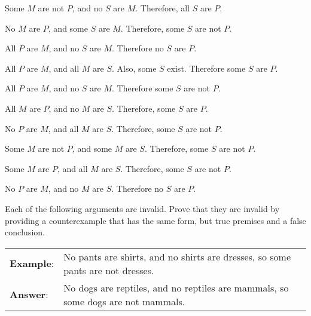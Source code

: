 \begin{exercises}

\item Some $M$ are not $P$, and no $S$ are $M$. Therefore, all $S$ are $P$.

\item No $M$ are $P$, and some $S$ are $M$. Therefore, some $S$ are not $P$.

\item All $P$ are $M$, and no $S$ are $M$. Therefore no $S$ are $P$.

\item All $P$ are $M$, and all $M$ are $S$. Also, some $S$ exist. Therefore some $S$ are $P$.

\item All $P$ are $M$, and no $S$ are $M$. Therefore some $S$ are not $P$.

\item All $M$ are $P$, and no $M$ are $S$. Therefore, some $S$ are $P$.

\item No $P$ are $M$, and all $M$ are $S$. Therefore, some $S$ are not $P$.

\item Some $M$ are not $P$, and some $M$ are $S$. Therefore, some $S$ are not $P$.

\item Some $M$ are $P$, and all $M$ are $S$. Therefore, some $S$ are not $P$.

\item No $P$ are $M$, and no $M$ are $S$. Therefore no $S$ are $P$.

\end{exercises}


\practiceproblems

\noindent\problempart Each of the following arguments are invalid. Prove that they are invalid by providing a counterexample that has the same form, but true premises and a false conclusion.

\begin{longtabu}{p{.1\linewidth}p{.9\linewidth}}
\textbf{Example}: & No pants are shirts, and no shirts are dresses, so some pants are not dresses. \\
\textbf{Answer}: & No dogs are reptiles, and no reptiles are mammals, so some dogs are not mammals.   \\
\end{longtabu}

%



